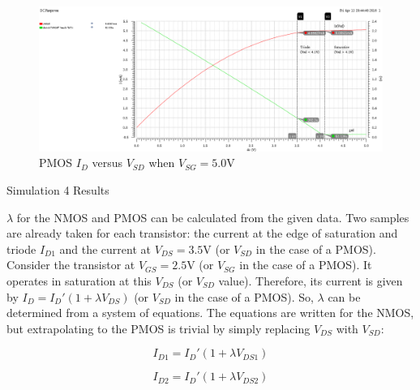 \FloatBarrier

\FloatBarrier

\begin{figure}[h!]
	\centering
	\includegraphics[scale=0.45]{./images/id_vs_vds_vgs_is_5_pmos.PNG}
	\caption{PMOS $I_{D}$ versus $V_{SD}$ when $V_{SG} = 5.0$\si{\volt}}
	\label{fig:id_vs_vds_vgs_is_5_pmos}
\end{figure}

\FloatBarrier

\FloatBarrier

\begin{table}[h!]
	\centering
	\caption{Simulation 4 Results}
	\label{tab:sim4_results}
\end{table}

\FloatBarrier

$\lambda$ for the NMOS and PMOS can be calculated from the given data.
Two samples are already taken for each transistor: the current at the edge of saturation and triode $I_{D1}$ and the current at $V_{DS} = 3.5$\si{\volt} (or $V_{SD}$ in the case of a PMOS).
Consider the transistor at $V_{GS} = 2.5$\si{\volt} (or $V_{SG}$ in the case of a PMOS).
It operates in saturation at this $V_{DS}$ (or $V_{SD}$ value).
Therefore, its current is given by $I_{D} = I_{D}' ( 1 + \lambda V_{DS} )$ (or $V_{SD}$ in the case of a PMOS).
So, $\lambda$ can be determined from a system of equations.
The equations are written for the NMOS, but extrapolating to the PMOS is trivial by simply replacing $V_{DS}$ with $V_{SD}$:

\begin{equation}
	\label{eq:lambda_eqn_1}
	I_{D1} = I_{D}' ( 1 + \lambda V_{DS1} )
\end{equation}

\begin{equation}
	\label{eq:lambda_eqn_2}
	I_{D2} = I_{D}' ( 1 + \lambda V_{DS2} )
\end{equation}

